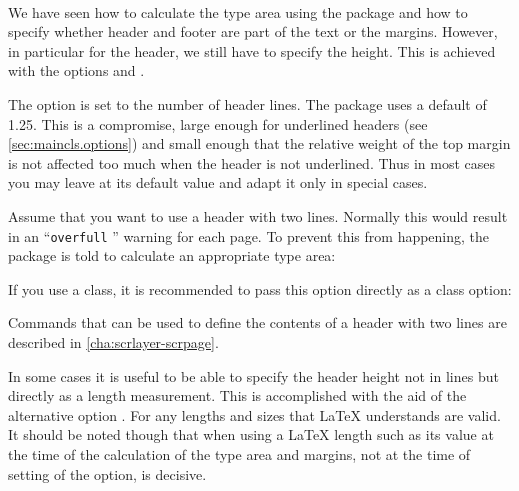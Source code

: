 \begin{Declaration}
  \\
\end{Declaration}%
We have seen how to calculate the type area using the
 package and how to specify whether header and
footer are part of the text or the margins. However, in particular for
the header, we still have to specify the height. This is achieved with
the options  and
.

The option  is set to the number of header
lines. The  package uses a default of 1.25. This is
a compromise, large enough for underlined headers (see
\autoref{sec:maincls.options}) and small enough that the relative
weight of the top margin is not affected too much when the header is
not underlined. Thus in most cases you may leave  at
its default value and adapt it only in special cases.

\begin{Example}
  Assume that you want to use a header with two lines. Normally this would
  result in an ``\texttt{overfull} '' warning for each page. To
  prevent this from happening, the  package is told to
  calculate an appropriate type area:
If you use a {\KOMAScript} class, it is recommended to pass this option
directly as a class option:
Commands that can be used to define the contents of a header with two lines
are described in \autoref{cha:scrlayer-scrpage}.
\end{Example}

In some cases it is useful to be able to specify the header height not
in lines but directly as a length measurement. This is accomplished
with the aid of the alternative option . For
 any lengths and sizes that \LaTeX{} understands are
valid. It should be noted though that when using a \LaTeX{} length
such as  its value at the time of the calculation
of the type area and margins, not at the time of setting of the
option, is decisive.

